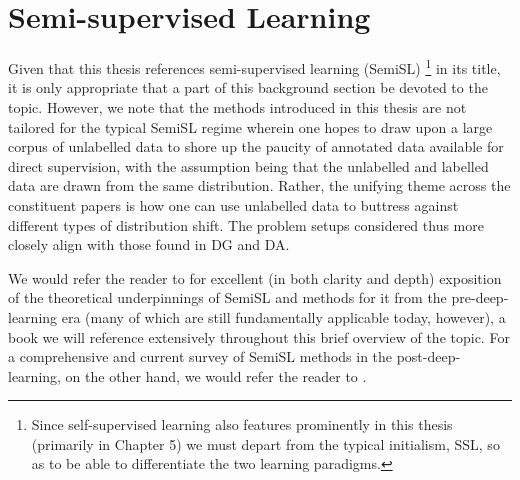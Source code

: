 \section{ Semi-supervised Learning }\label{sec:semisl}
%
Given that this thesis references semi-supervised learning (SemiSL)
%
\footnote{ Since self-supervised learning also features prominently in this thesis (primarily in
Chapter 5) we must depart from the typical initialism, SSL, so as to be able to differentiate the
two learning paradigms. }
%
in its title, it is only appropriate that a part of this background section be devoted to the
topic.
%
However, we note that the methods introduced in this thesis are not tailored for the typical SemiSL
regime wherein one hopes to draw upon a large corpus of unlabelled data to shore up the paucity of
annotated data available for direct supervision, with the assumption being that the unlabelled and
labelled data are drawn from the same distribution.
%
Rather, the unifying theme across the constituent papers is how one can use unlabelled data to
buttress against different types of distribution shift.
%
The problem setups considered thus more closely align with those found in DG and DA. 

We would refer the reader to \cite{chapelle2009semi} for excellent (in both clarity and depth)
exposition of the theoretical underpinnings of SemiSL and methods for it from the pre-deep-learning
era (many of which are still fundamentally applicable today, however), a book we will reference
extensively throughout this brief overview of the topic.
%
For a comprehensive and current survey of SemiSL methods in the post-deep-learning, on the other
hand, we would refer the reader to \cite{yang2022survey}.
%

